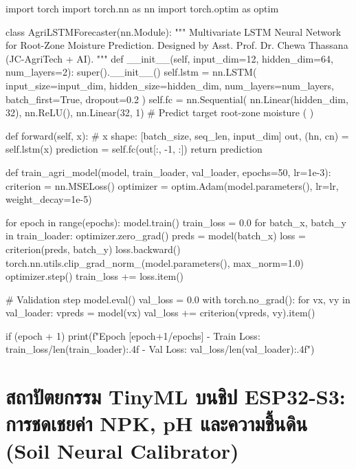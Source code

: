 \begin{pythonbox}
import torch
import torch.nn as nn
import torch.optim as optim

class AgriLSTMForecaster(nn.Module):
    """
    Multivariate LSTM Neural Network for Root-Zone Moisture Prediction.
    Designed by Asst. Prof. Dr. Chewa Thassana (JC-AgriTech + AI).
    """
    def __init__(self, input_dim=12, hidden_dim=64, num_layers=2):
        super().__init__()
        self.lstm = nn.LSTM(
            input_size=input_dim,
            hidden_size=hidden_dim,
            num_layers=num_layers,
            batch_first=True,
            dropout=0.2
        )
        self.fc = nn.Sequential(
            nn.Linear(hidden_dim, 32),
            nn.ReLU(),
            nn.Linear(32, 1) # Predict target root-zone moisture (%
        )
        
    def forward(self, x):
        # x shape: [batch_size, seq_len, input_dim]
        out, (hn, cn) = self.lstm(x)
        prediction = self.fc(out[:, -1, :])
        return prediction

def train_agri_model(model, train_loader, val_loader, epochs=50, lr=1e-3):
    criterion = nn.MSELoss()
    optimizer = optim.Adam(model.parameters(), lr=lr, weight_decay=1e-5)
    
    for epoch in range(epochs):
        model.train()
        train_loss = 0.0
        for batch_x, batch_y in train_loader:
            optimizer.zero_grad()
            preds = model(batch_x)
            loss = criterion(preds, batch_y)
            loss.backward()
            torch.nn.utils.clip_grad_norm_(model.parameters(), max_norm=1.0)
            optimizer.step()
            train_loss += loss.item()
            
        # Validation step
        model.eval()
        val_loss = 0.0
        with torch.no_grad():
            for vx, vy in val_loader:
                vpreds = model(vx)
                val_loss += criterion(vpreds, vy).item()
                
        if (epoch + 1) %
            print(f"Epoch [{epoch+1}/{epochs}] - Train Loss: {train_loss/len(train_loader):.4f} - Val Loss: {val_loss/len(val_loader):.4f}")
\end{pythonbox}

\section{สถาปัตยกรรม TinyML บนชิป ESP32-S3: การชดเชยค่า NPK, pH และความชื้นดิน (Soil Neural Calibrator)}
\label{sec:tinyml_soil_calibrator}

